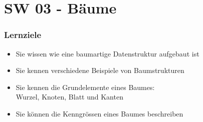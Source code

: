 \part{SW 03 - Bäume}
\section{Lernziele}
\begin{itemize}
    \item Sie wissen wie eine baumartige Datenstruktur aufgebaut ist
    \item Sie kennen verschiedene Beispiele von Baumstrukturen
    \item Sie kennen die Grundelemente eines Baumes:\\
    Wurzel, Knoten, Blatt und Kanten
    \item Sie können die Kenngrössen eines Baumes beschreiben
\end{itemize}

